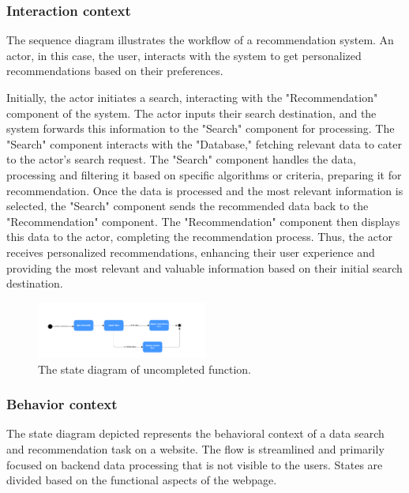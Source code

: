 \documentclass[conference]{IEEEtran}
\begin{document}
\subsubsection{\textbf{Interaction context }}

The sequence diagram illustrates the workflow of a recommendation system. An actor, in this case, the user, interacts with the system to get personalized recommendations based on their preferences.

Initially, the actor initiates a search, interacting with the "Recommendation" component of the system. The actor inputs their search destination, and the system forwards this information to the "Search" component for processing. The "Search" component interacts with the "Database," fetching relevant data to cater to the actor's search request. The "Search" component handles the data, processing and filtering it based on specific algorithms or criteria, preparing it for recommendation. Once the data is processed and the most relevant information is selected, the "Search" component sends the recommended data back to the "Recommendation" component. The "Recommendation" component then displays this data to the actor, completing the recommendation process. Thus, the actor receives personalized recommendations, enhancing their user experience and providing the most relevant and valuable information based on their initial search destination.

\begin{figure}[htbp]
	\centerline{\includegraphics[width=0.5\textwidth]{uncompleted/state_uncompleted.pdf}}
	\caption{The state diagram of uncompleted function. }
	\label{uncompleted4}
\end{figure}


\subsubsection{\textbf{Behavior context }}

The state diagram depicted represents the behavioral context of a data search and recommendation task on a website. The flow is streamlined and primarily focused on backend data processing that is not visible to the users. States are divided based on the functional aspects of the webpage.
\end{document}
